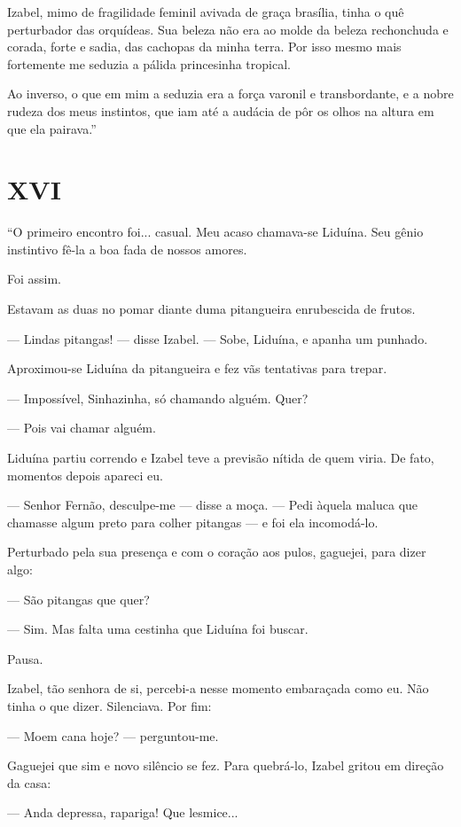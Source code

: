 Izabel, mimo de fragilidade feminil avivada de graça brasília, tinha o
quê perturbador das orquídeas. Sua beleza não era ao molde da beleza
rechonchuda e corada, forte e sadia, das cachopas da minha terra. Por
isso mesmo mais fortemente me seduzia a pálida princesinha tropical.

Ao inverso, o que em mim a seduzia era a força varonil e transbordante,
e a nobre rudeza dos meus instintos, que iam até a audácia de pôr os
olhos na altura em que ela pairava.''

\section{XVI}

``O primeiro encontro foi... casual. Meu acaso chamava-se Liduína. Seu
gênio instintivo fê-la a boa fada de nossos amores.

Foi assim.

Estavam as duas no pomar diante duma pitangueira enrubescida de frutos.

--- Lindas pitangas! --- disse Izabel. --- Sobe, Liduína, e apanha um
punhado.

Aproximou-se Liduína da pitangueira e fez vãs tentativas para trepar.

--- Impossível, Sinhazinha, só chamando alguém. Quer?

--- Pois vai chamar alguém.

Liduína partiu correndo e Izabel teve a previsão nítida de quem viria.
De fato, momentos depois apareci eu.

--- Senhor Fernão, desculpe-me --- disse a moça. --- Pedi àquela maluca
que chamasse algum preto para colher pitangas --- e foi ela incomodá-lo.

Perturbado pela sua presença e com o coração aos pulos, gaguejei, para
dizer algo:

--- São pitangas que quer?

--- Sim. Mas falta uma cestinha que Liduína foi buscar.

Pausa.

Izabel, tão senhora de si, percebi-a nesse momento embaraçada como eu.
Não tinha o que dizer. Silenciava. Por fim:

--- Moem cana hoje? --- perguntou-me.

Gaguejei que sim e novo silêncio se fez. Para quebrá-lo, Izabel gritou
em direção da casa:

--- Anda depressa, rapariga! Que lesmice...

